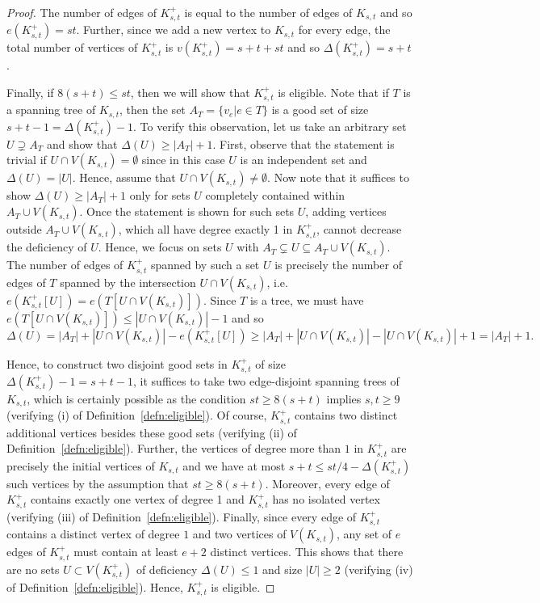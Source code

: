 \documentclass{daj}
\theoremstyle{plain}
\theoremstyle{remark}
\begin{document}
\begin{proof}
The number of edges of $K_{s, t}^+$ is equal to the number of edges of $K_{s, t}$ and so $e(K_{s, t}^+)=st$. Further, since we add a new vertex to $K_{s, t}$ for every edge, the total number of vertices of $K_{s, t}^+$ is $v(K_{s, t}^+)=s+t+st$ and so $\Delta(K_{s, t}^+)=s+t$.

Finally, if $8(s+t)\leq st$, then we will show that $K_{s, t}^+$ is eligible. Note that if $T$ is a spanning tree of $K_{s, t}$, then the set $A_T=\{v_e | e\in T\}$ is a good set of size $s+t-1=\Delta(K_{s, t}^+)-1$. To verify this observation, let us take an arbitrary set $U\supsetneq A_T$ and show that $\Delta(U)\geq |A_T|+1$. First, observe that the statement is trivial if $U\cap V(K_{s,t})=\emptyset$ since in this case $U$ is an independent set and $\Delta(U)=|U|$. Hence, assume that $U\cap V(K_{s,t})\neq \emptyset$. Now note that it suffices to show $\Delta(U)\geq |A_T|+1$ only for sets $U$ completely contained within $A_T\cup V(K_{s, t})$. Once the statement is shown for such sets $U$, adding vertices outside $A_T\cup V(K_{s, t})$, which all have degree exactly 1 in $K_{s, t}^+$, cannot decrease the deficiency of $U$. Hence, we focus on sets $U$ with $A_T\subsetneq U\subseteq A_T\cup V(K_{s, t})$. The number of edges of $K_{s, t}^+$ spanned by such a set $U$ is precisely the number of edges of $T$ spanned by the intersection $U\cap V(K_{s, t})$, i.e. $e(K_{s, t}^+[U])=e(T[U\cap V(K_{s, t})])$. Since $T$ is a tree, we must have $e(T[U\cap V(K_{s, t})])\leq |U\cap V(K_{s, t})|-1$ and so 
\[\Delta(U)=|A_T|+|U\cap V(K_{s, t})|-e(K_{s, t}^+[U])\geq |A_T|+|U\cap V(K_{s, t})|-|U\cap V(K_{s, t})|+1=|A_T|+1.\]

Hence, to construct two disjoint good sets in $K_{s, t}^+$ of size $\Delta(K_{s, t}^+)-1=s+t-1$, it suffices to take two edge-disjoint spanning trees of $K_{s, t}$, which is certainly possible as the condition $st\geq 8(s+t)$ implies $s, t\geq 9$ (verifying (i) of Definition~\ref{defn:eligible}). Of course, $K_{s, t}^+$ contains two distinct additional vertices besides these good sets (verifying (ii) of Definition~\ref{defn:eligible}). Further, the vertices of degree more than $1$ in $K_{s, t}^+$ are precisely the initial vertices of $K_{s, t}$ and we have at most $s+t\leq st/4-\Delta(K_{s, t}^+)$ such vertices by the assumption that $st\geq 8(s+t)$. Moreover, every edge of $K_{s, t}^+$ contains exactly one vertex of degree 1 and $K_{s,t}^+$ has no isolated vertex (verifying (iii) of Definition~\ref{defn:eligible}). Finally, since every edge of $K_{s, t}^+$ contains a distinct vertex of degree $1$ and two vertices of $V(K_{s, t})$, any set of $e$ edges of $K_{s, t}^+$ must contain at least $e+2$ distinct vertices. This shows that there are no sets $U\subset V(K_{s, t}^+)$ of deficiency $\Delta(U)\leq 1$ and size $|U|\geq 2$ (verifying (iv) of Definition~\ref{defn:eligible}). Hence, $K_{s, t}^+$ is eligible.
\end{proof}
\end{document}
